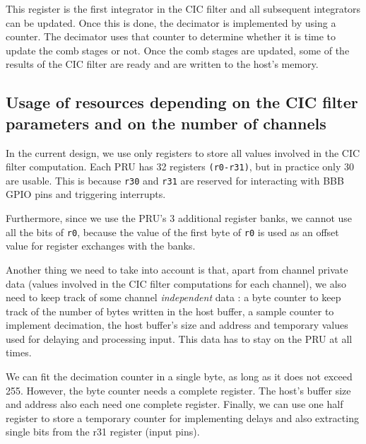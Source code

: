 \documentclass[]{report}
\begin{document}
This register is the first integrator in the CIC filter and all subsequent integrators can be updated. Once this is done, the decimator is implemented by using a counter. The decimator uses that counter to determine whether it is time to update the comb stages or not. Once the comb stages are updated, some of the results of the CIC filter are ready and are written to the host's memory.

\hypertarget{usage-of-resources-depending-on-the-cic-filter-parameters-n-m-r-and-on-the-number-of-channels-c}{%
\subsection{\texorpdfstring{Usage of resources depending on the CIC
filter parameters and on the number of channels}{Usage of resources depending on the CIC filter parameters N, M, R and on the number of channels C}}\label{usage-of-resources-depending-on-the-cic-filter-parameters-n-m-r-and-on-the-number-of-channels-c}}

In the current design, we use only registers to store all values involved in the CIC filter computation. Each PRU has 32 registers \texttt{(r0-r31)}, but in practice only 30 are usable. This is because \texttt{r30} and \texttt{r31} are reserved for interacting with BBB GPIO pins and triggering interrupts.

Furthermore, since we use the PRU's 3 additional register banks, we cannot use all the bits of \texttt{r0}, because the value of the first byte of \texttt{r0} is used as an offset value for register exchanges with the banks.

Another thing we need to take into account is that, apart from channel private data (values involved in the CIC filter computations for each channel), we also need to keep track of some channel \textit{independent} data : a byte counter to keep track of the number of bytes written in the host buffer, a sample counter to implement decimation, the host buffer's size and address and temporary values used for delaying and processing input. This data has to stay on the PRU at all times.

We can fit the decimation counter in a single byte, as long as it does not exceed 255. However, the byte counter needs a complete register. The host's buffer size and address also each need one complete register. Finally, we can use one half register to store a temporary counter for implementing delays and also extracting single bits from the r31 register (input pins).
\end{document}
